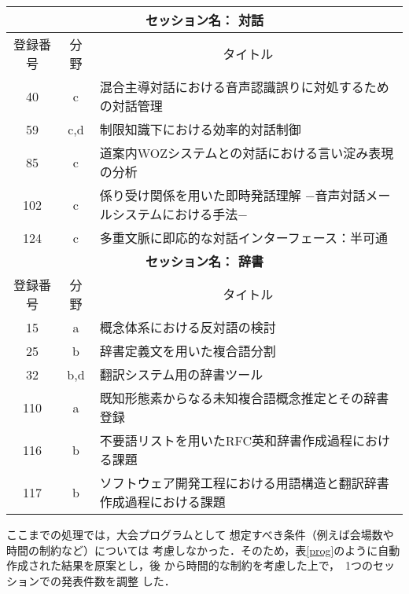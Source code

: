 \begin{table*}
\begin{center}
\caption[表]{\label{prog}自動分類した結果の例}
\footnotesize 
\begin{tabular}{|c|c|l|}\hline 
\multicolumn{3}{|c|}{\bf セッション名： 対話} \\\hline
登録番号 & 分野 & \multicolumn{1}{|c|}{タイトル}\\\hline
  40 & c  & 混合主導対話における音声認識誤りに対処するための対話管理 \\\hline
59 & c,d  & 制限知識下における効率的対話制御 \\\hline
  85 & c  & 道案内WOZシステムとの対話における言い淀み表現の分析 \\\hline
 102 & c  & 係り受け関係を用いた即時発話理解 −音声対話メールシステムにおける手法−\\\hline
 124 & c  & 多重文脈に即応的な対話インターフェース：半可通 \\\hline
\multicolumn{3}{|c|}{\bf セッション名： 辞書} \\\hline
登録番号 & 分野 & \multicolumn{1}{|c|}{タイトル}\\\hline
  15 & a  & 概念体系における反対語の検討 \\\hline 
  25 & b  & 辞書定義文を用いた複合語分割 \\\hline
32 & b,d  & 翻訳システム用の辞書ツール \\ \hline
 110 & a  & 既知形態素からなる未知複合語概念推定とその辞書登録 \\\hline
 116 & b  & 不要語リストを用いたRFC英和辞書作成過程における課題 \\ \hline
 117 & b  & ソフトウェア開発工程における用語構造と翻訳辞書作成過程における課題 \\ \hline 
\end{tabular}
\end{center}
\end{table*}

ここまでの処理では，大会プログラムとして
想定すべき条件（例えば会場数や時間の制約など）については
考慮しなかった．そのため，表\ref{prog}のように自動作成された結果を原案とし，後
から時間的な制約を考慮した上で，\ 1つのセッションでの発表件数を調整
した．

